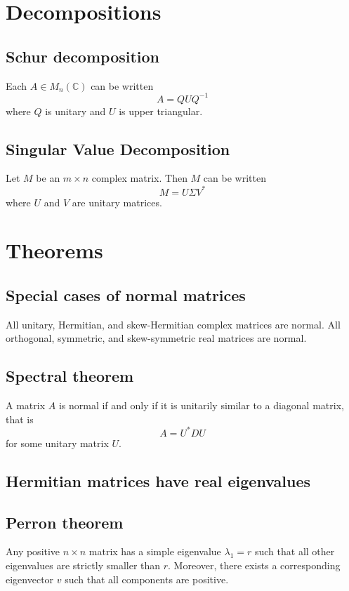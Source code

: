 \documentclass{article}
\begin{document}
\section{Decompositions}

\subsection{Schur decomposition}
Each $A \in M_n(\mathbb C)$ can be written \[
  A = QUQ^{-1}
\] where $Q$ is unitary and $U$ is upper triangular.
\subsection{Singular Value Decomposition}
Let $M$ be an $m \times n$ complex matrix. Then $M$ can be written \[
  M = U \Sigma V^*
\] where $U$ and $V$ are unitary matrices.

\section{Theorems}
\subsection{Special cases of normal matrices}
All unitary, Hermitian, and skew-Hermitian complex matrices are normal.
All orthogonal, symmetric, and skew-symmetric real matrices are normal.
\subsection{Spectral theorem}
A matrix $A$ is normal if and only if it is unitarily similar to a diagonal
matrix, that is \[
  A = U^*DU
\] for some unitary matrix $U$.

\subsection{Hermitian matrices have real eigenvalues}

\subsection{Perron theorem}
Any positive $n \times n$ matrix has a simple eigenvalue $\lambda_1 = r$ such that
all other eigenvalues are strictly smaller than $r$. Moreover, there exists
a corresponding eigenvector $v$ such that all components are positive.
\end{document}
